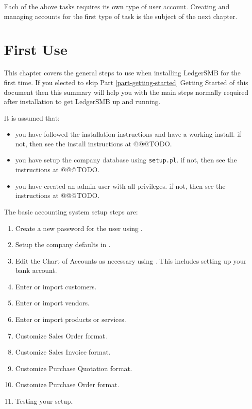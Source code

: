Each of the above tasks requires its own type of user account. Creating and managing accounts
for the first type of task is the subject of the next chapter.

\chapter{First Use}
\label{cha-first-use}

This chapter covers the general steps to use when installing LedgerSMB for the first time.
If you elected to skip Part \ref{part-getting-started} Getting Started of this document 
then this summary will
help you with the main steps normally required after installation to get LedgerSMB up and running. 

It is assumed that:
\begin{itemize}
        \item you have followed the installation instructions and have a working install.
        if not, then see the install instructions at @@@TODO.
        \item you have setup the company database using \texttt{setup.pl}.
        if not, then see the instructions at @@@TODO.
        \item  you have created an admin user with all privileges.
        if not, then see the instructions at @@@TODO.
\end{itemize} 

The basic accounting system setup steps are:

\begin{enumerate}
        \item Create a new password for the user using .
        \item Setup the company defaults in .
        \item Edit the Chart of Accounts as necessary using .
        This includes setting up your bank account.
        \item Enter or import customers.
        \item Enter or import vendors.
        \item Enter or import products or services.
        \item Customize Sales Order format.
        \item Customize Sales Invoice format.
        \item Customize Purchase Quotation format.
        \item Customize Purchase Order format.
        \item Testing your setup.
\end{enumerate}

